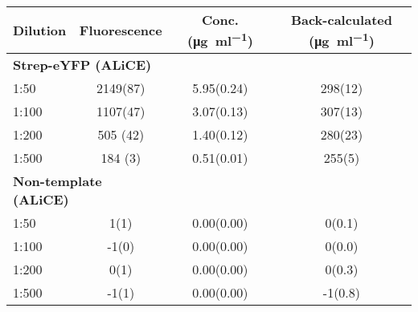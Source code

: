 \begin{supptable}[ht]
    \centering
    \caption{\textbf{Measured fluorescence and estimated eYFP concentrations for Strep-eYFP (ALiCE) and Non-template (ALiCE). } The concentration was calculated from the fluorescence using the linear model shown in \autoref{fig:calibration_eyfp}. Back-calculation of the original sample concentration was done by multiplication with the dilution factor. }
    \label{tab:sample_values_eyfp}
    \begin{tabular}{
        l
        S[table-format=4.0(2),uncertainty-mode = separate]
        S[table-format=1.2(2),uncertainty-mode = separate]
        S[table-format=3.1(2),uncertainty-mode = separate]
    }
    \toprule
    {\textbf{Dilution}} &
    {\textbf{Fluorescence}} &
    {\textbf{Conc. (\si{\micro\gram\per\milli\litre})}} &
    {\textbf{Back-calculated (\si{\micro\gram\per\milli\litre})}} \\
    \midrule
     \\
    1:50   & 2149(87)   & 5.95(0.24) & 298(12) \\
    1:100  & 1107(47)   & 3.07(0.13) & 307(13) \\
    1:200  & 505 (42)    & 1.40(0.12) & 280(23) \\
    1:500  & 184 (3)    & 0.51(0.01) & 255(5) \\
    \midrule
     \\
    1:50   & 1(1)       & 0.00(0.00) & 0(0.1) \\
    1:100  & -1(0)      & 0.00(0.00) & 0(0.0) \\
    1:200  & 0(1)      & 0.00(0.00) & 0(0.3) \\
    1:500  & -1(1)      & 0.00(0.00) & -1(0.8) \\
    \bottomrule
    \end{tabular}
\end{supptable}

